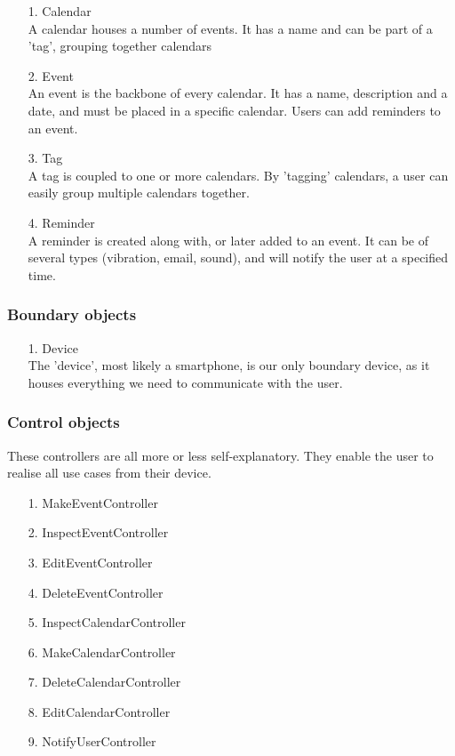 \begin{enumerate}
	\item[1.] Calendar \hfill \\
	A calendar houses a number of events. It has a name and can be part of a 'tag', grouping together calendars
	\item[2.] Event \hfill \\
	An event is the backbone of every calendar. It has a name, description and a date, and must be placed in a specific calendar. Users can add reminders to an event.
	\item[3.] Tag \hfill \\
	A tag is coupled to one or more calendars. By 'tagging' calendars, a user can easily group multiple calendars together.
	\item[4.] Reminder \hfill \\
	A reminder is created along with, or later added to an event. It can be of several types (vibration, email, sound), and will notify the user at a specified time.
\end{enumerate}

\subsubsection{Boundary objects}

\begin{enumerate}
	\item[1.] Device \hfill \\
	The 'device', most likely a smartphone, is our only boundary device, as it houses everything we need to communicate with the user.
\end{enumerate}

\subsubsection{Control objects}

These controllers are all more or less self-explanatory. They enable the user to realise all use cases from their device.

\begin{enumerate}
	\item[1.] MakeEventController
	\item[2.] InspectEventController
	\item[3.] EditEventController 
	\item[4.] DeleteEventController
	\item[5.] InspectCalendarController
	\item[6.] MakeCalendarController
	\item[7.] DeleteCalendarController
	\item[8.] EditCalendarController 
	\item[9.] NotifyUserController 
\end{enumerate}

